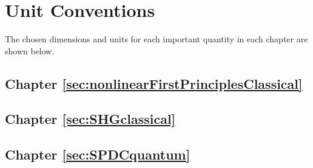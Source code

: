 \documentclass{article}
\begin{document}

\newpage
\appendix
{}

\section{Unit Conventions}\label{app:unitConventions}

The chosen dimensions and units for each important quantity in each chapter are shown below.

\subsection{Chapter \ref{sec:nonlinearFirstPrinciplesClassical}}

\subsection{Chapter \ref{sec:SHGclassical}}

\subsection{Chapter \ref{sec:SPDCquantum}}
\end{document}
